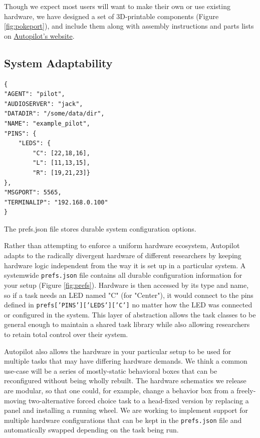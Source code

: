 Though we expect most users will want to make their own or use existing hardware, we have designed a set of 3D-printable components (Figure \ref{fig:pokeport}), and include them along with assembly instructions and parts lists on \href{https://auto-pi-lot.com/hardware/}{Autopilot's website}. 
\clearpage

\subsection{System Adaptability}

\begin{marginfigure}[0.4cm]
\begin{verbatim}
{
"AGENT": "pilot",
"AUDIOSERVER": "jack",
"DATADIR": "/some/data/dir",
"NAME": "example_pilot",
"PINS": {
    "LEDS": {
        "C": [22,18,16],
        "L": [11,13,15],
        "R": [19,21,23]}
},
"MSGPORT": 5565,
"TERMINALIP": "192.168.0.100"
}
\end{verbatim}
\caption{The prefs.json file stores durable system configuration options.}
\label{fig:prefs}
\end{marginfigure}%

Rather than attempting to enforce a uniform hardware ecosystem, Autopilot adapts to the radically divergent hardware of different researchers by keeping hardware logic independent from the way it is set up in a particular system. A systemwide \texttt{prefs.json} file contains all durable configuration information for your setup (Figure \ref{fig:prefs}). Hardware is then accessed by its type and name, so if a task needs an LED named "C" (for "Center"), it would connect to the pins defined in  \texttt{prefs['PINS']['LEDS']['C']} no matter how the LED was connected or configured in the system. This layer of abstraction allows the task classes to be general enough to maintain a shared task library while also allowing researchers to retain total control over their system. 
 
Autopilot also allows the hardware in your particular setup to be used for multiple tasks that may have differing hardware demands. We think a common use-case will be a series of mostly-static behavioral boxes that can be reconfigured without being wholly rebuilt. The hardware schematics we release are modular, so that one could, for example, change a behavior box from a freely-moving two-alternative forced choice task to a head-fixed version by replacing a panel and installing a running wheel. We are working to implement support for multiple hardware configurations that can be kept in the \texttt{prefs.json} file and automatically swapped depending on the task being run.

